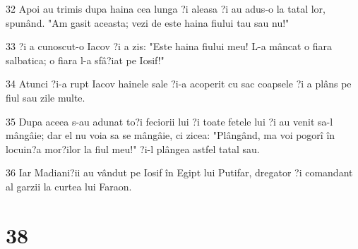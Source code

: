 \par 32 Apoi au trimis dupa haina cea lunga ?i aleasa ?i au adus-o la tatal lor, spunând. "Am gasit aceasta; vezi de este haina fiului tau sau nu!"
\par 33 ?i a cunoscut-o Iacov ?i a zis: "Este haina fiului meu! L-a mâncat o fiara salbatica; o fiara l-a sfâ?iat pe Iosif!"
\par 34 Atunci ?i-a rupt Iacov hainele sale ?i-a acoperit cu sac coapsele ?i a plâns pe fiul sau zile multe.
\par 35 Dupa aceea s-au adunat to?i feciorii lui ?i toate fetele lui ?i au venit sa-l mângâie; dar el nu voia sa se mângâie, ci zicea: "Plângând, ma voi pogorî în locuin?a mor?ilor la fiul meu!" ?i-l plângea astfel tatal sau.
\par 36 Iar Madiani?ii au vândut pe Iosif în Egipt lui Putifar, dregator ?i comandant al garzii la curtea lui Faraon.

\chapter{38}

